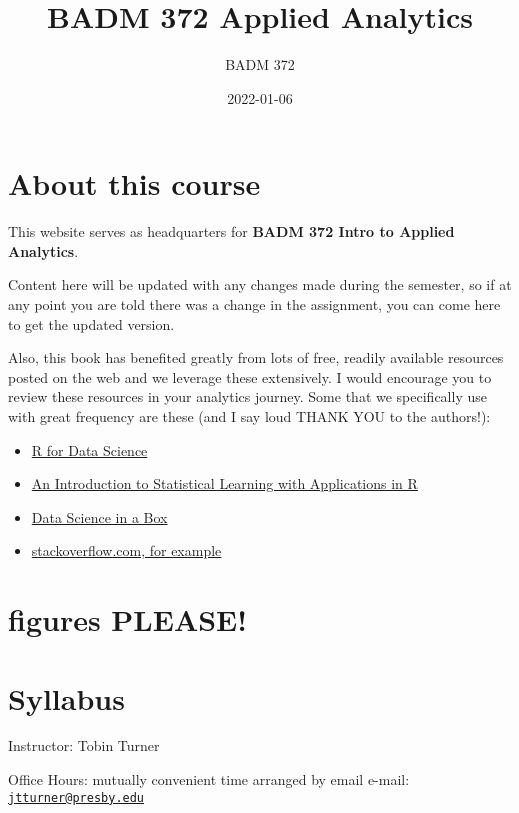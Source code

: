 \documentclass[
]{book}
\title{BADM 372 Applied Analytics}
\author{BADM 372}
\date{2022-01-06}
\providecommand{\tightlist}{%
  \setlength{\itemsep}{0pt}\setlength{\parskip}{0pt}}
\theoremstyle{definition}
\theoremstyle{definition}
\theoremstyle{definition}
\theoremstyle{definition}
\theoremstyle{remark}
\begin{document}
\maketitle

{
\setcounter{tocdepth}{1}
\tableofcontents
}
\hypertarget{about-this-course}{%
\chapter{About this course}\label{about-this-course}}

This website serves as headquarters for \textbf{BADM 372 Intro to Applied Analytics}.

Content here will be updated with any changes made during the semester, so if at any point you are told there was a change in the assignment, you can come here to get the updated version.

Also, this book has benefited greatly from lots of free, readily available resources posted on the web and we leverage these extensively. I would encourage you to review these resources in your analytics journey. Some that we specifically use with great frequency are these (and I say loud THANK YOU to the authors!):

\begin{itemize}
\tightlist
\item
  \href{https://r4ds.had.co.nz/}{R for Data Science}
\item
  \href{https://trevorhastie.github.io/ISLR/}{An Introduction to Statistical Learning with Applications in R}
\item
  \href{https://datasciencebox.org/}{Data Science in a Box}
\item
  \href{https://stackoverflow.com/questions/4862178/remove-rows-with-all-or-some-nas-missing-values-in-data-frame?rq=1}{stackoverflow.com, for example}
\end{itemize}

\hypertarget{figures-please}{%
\chapter{figures PLEASE!}\label{figures-please}}

\hypertarget{syllabus}{%
\chapter{Syllabus}\label{syllabus}}

Instructor: Tobin Turner

Office Hours: mutually convenient time arranged by email e-mail: \href{mailto:jtturner@presby.edu}{\nolinkurl{jtturner@presby.edu}}
\end{document}
